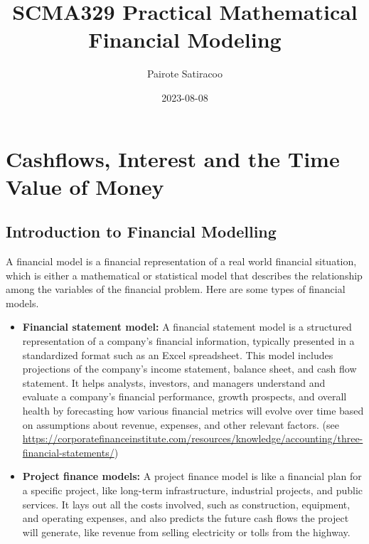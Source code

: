 \documentclass[
]{book}
\title{SCMA329 Practical Mathematical Financial Modeling}
\author{Pairote Satiracoo}
\date{2023-08-08}
\providecommand{\tightlist}{%
  \setlength{\itemsep}{0pt}\setlength{\parskip}{0pt}}
\theoremstyle{definition}
\theoremstyle{definition}
\theoremstyle{definition}
\theoremstyle{definition}
\theoremstyle{remark}
\begin{document}
\maketitle

{
\setcounter{tocdepth}{1}
\tableofcontents
}
\hypertarget{cashflows-interest-and-the-time-value-of-money}{%
\chapter{Cashflows, Interest and the Time Value of Money}\label{cashflows-interest-and-the-time-value-of-money}}

\hypertarget{introduction-to-financial-modelling}{%
\section{Introduction to Financial Modelling}\label{introduction-to-financial-modelling}}

A financial model is a financial representation of a real world
financial situation, which is either a mathematical or statistical model
that describes the relationship among the variables of the financial
problem. Here are some types of financial models.

\begin{itemize}
\tightlist
\item
  \textbf{Financial statement model:} A financial statement model is a structured representation of a company's financial information, typically presented in a standardized format such as an Excel spreadsheet. This model includes projections of the company's income statement, balance sheet, and cash flow statement. It helps analysts, investors, and managers understand and evaluate a company's financial performance, growth prospects, and overall health by forecasting how various financial metrics will evolve over time based on assumptions about revenue, expenses, and other relevant factors. (see
  \url{https://corporatefinanceinstitute.com/resources/knowledge/accounting/three-financial-statements/})
\end{itemize}

\begin{itemize}
\tightlist
\item
  \textbf{Project finance models:} A project finance model is like a financial plan for a specific project, like long-term infrastructure, industrial projects, and public services. It lays out all the costs involved, such as construction, equipment, and operating expenses, and also predicts the future cash flows the project will generate, like revenue from selling electricity or tolls from the highway.
\end{itemize}
\end{document}
